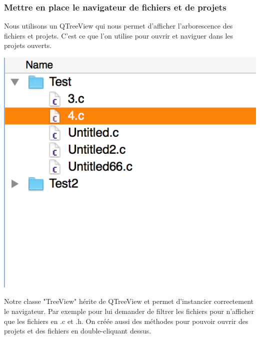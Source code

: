 \documentclass[a4paper,12pt]{article}
\begin{document}
			\subsubsection*{Mettre en place le navigateur de fichiers et de projets}
			 Nous utilisons un QTreeView qui nous permet d'afficher l'arborescence des fichiers et projets. C'est ce que l'on utilise pour ouvrir et naviguer dans les projets ouverts.\\
			\begin{center}
				\includegraphics[scale=0.6]{images/QTreeView}
				\vspace{0.6cm}
			\end{center}
			Notre classe "TreeView" hérite de QTreeView et permet d'instancier correctement le navigateur. Par exemple pour lui demander de filtrer les fichiers pour n'afficher que les fichiers en .c et .h. On créée aussi des méthodes pour pouvoir ouvrir des projets et des fichiers en double-cliquant dessus.\\			
			
			
\end{document}
